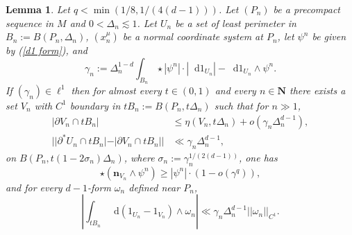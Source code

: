 \documentclass[reqno,10pt]{amsart}
\newcommand{\NN}{\mathbf{N}}
\newcommand*\dif{\mathop{}\!\mathrm{d}}
\newcommand{\normal}{\mathbf n}
\newtheorem{lemma}[theorem]{Lemma}
\theoremstyle{definition}
\numberwithin{equation}{section}
\begin{document}
\begin{lemma}\label{mollifier quant}
Let $q < \min(1/8, 1/(4(d - 1)))$.
Let $(P_n)$ be a precompact sequence in $M$ and $0 < \Delta_n \lesssim 1$.
Let $U_n$ be a set of least perimeter in $B_n := B(P_n, \Delta_n)$, $(x^\mu_n)$ be a normal coordinate system at $P_n$, let $\psi^n$ be given by (\ref{d1 form}), and
$$\gamma_n := \Delta_n^{1 - d} \int_{B_n} \star |\psi^n| \cdot |\dif 1_{U_n}| - \dif 1_{U_n} \wedge \psi^n.$$
If $(\gamma_n) \in \ell^1$ then for almost every $t \in (0, 1)$ and every $n \in \NN$ there exists a set $V_n$ with $C^1$ boundary in $tB_n := B(P_n, t\Delta_n)$ such that for $n \gg 1$,
\begin{align}
|\partial V_n \cap tB_n| &\leq \eta(V_n, t\Delta_n) + o(\gamma_n \Delta_n^{d - 1}), \label{mollifier quant1}\\
||\partial^* U_n \cap tB_n| - |\partial V_n \cap tB_n|| &\ll \gamma_n \Delta_n^{d - 1}, \label{mollifier quant2}
\end{align}
on $B(P_n, t(1 - 2\sigma_n)\Delta_n)$, where $\sigma_n := \gamma_n^{1/(2(d - 1))}$, one has
\begin{equation}
\star(\normal_{V_n} \wedge \psi^n) \geq |\psi^n| \cdot (1 - o(\gamma^q)), \label{mollifier quant4}
\end{equation}
and for every $d-1$-form $\omega_n$ defined near $P_n$,
\begin{equation}\label{mollifier quant3}
\left|\int_{tB_n} \dif(1_{U_n} - 1_{V_n}) \wedge \omega_n\right| \ll \gamma_n \Delta_n^{d - 1} ||\omega_n||_{C^1}.
\end{equation}
\end{lemma}
\end{document}
